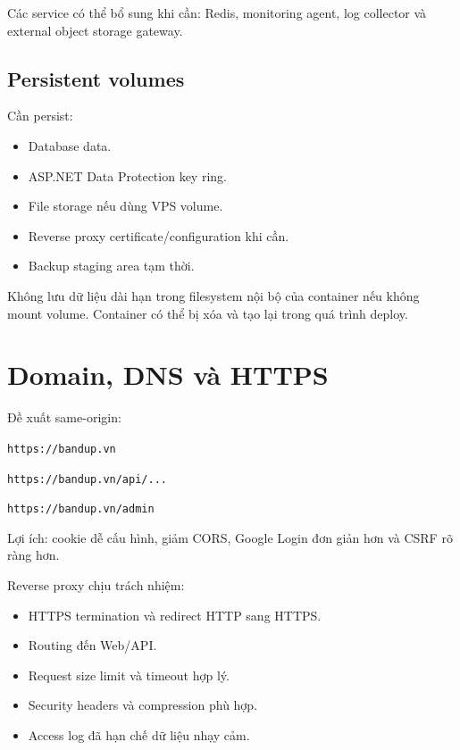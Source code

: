 \documentclass[11pt,a4paper]{article}
\newcommand{\code}[1]{\texttt{#1}}
\begin{document}
Các service có thể bổ sung khi cần: Redis, monitoring agent, log collector và external object storage gateway.

\subsection{Persistent volumes}

Cần persist:

\begin{itemize}
  \item Database data.
  \item ASP.NET Data Protection key ring.
  \item File storage nếu dùng VPS volume.
  \item Reverse proxy certificate/configuration khi cần.
  \item Backup staging area tạm thời.
\end{itemize}

\begin{criticalbox}
Không lưu dữ liệu dài hạn trong filesystem nội bộ của container nếu không mount volume. Container có thể bị xóa và tạo lại trong quá trình deploy.
\end{criticalbox}

\section{Domain, DNS và HTTPS}

Đề xuất same-origin:

\begin{flowbox}
\code{https://bandup.vn}

\code{https://bandup.vn/api/...}

\code{https://bandup.vn/admin}
\end{flowbox}

Lợi ích: cookie dễ cấu hình, giảm CORS, Google Login đơn giản hơn và CSRF rõ ràng hơn.

Reverse proxy chịu trách nhiệm:

\begin{itemize}
  \item HTTPS termination và redirect HTTP sang HTTPS.
  \item Routing đến Web/API.
  \item Request size limit và timeout hợp lý.
  \item Security headers và compression phù hợp.
  \item Access log đã hạn chế dữ liệu nhạy cảm.
\end{itemize}
\end{document}
